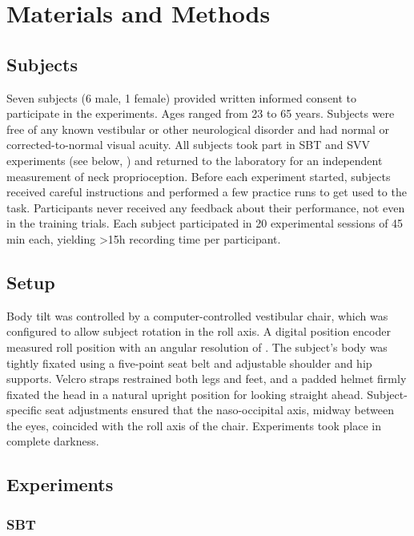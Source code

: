 \section{Materials and Methods}
\label{p1:sec:methods}

\subsection{Subjects}

Seven subjects (6 male, 1 female) provided written informed consent to participate in the experiments. Ages ranged from 23 to 65 years. Subjects were free of any known vestibular or other neurological disorder and had normal or corrected-to-normal visual acuity. All subjects took part in SBT and SVV experiments (see below, ) and returned to the laboratory for an independent measurement of neck proprioception. Before each experiment started, subjects received careful instructions and performed a few practice runs to get used to the task. Participants never received any feedback about their performance, not even in the training trials. Each subject participated in 20 experimental sessions of {\textapprox}45 min each, yielding {\textgreater}15h recording time per participant.

\subsection{Setup}

Body tilt was controlled by a computer-controlled vestibular chair, which was configured to allow subject rotation in the roll axis. A digital position encoder measured roll position with an angular resolution of . The subject's body was tightly fixated using a five-point seat belt and adjustable shoulder and hip supports. Velcro straps restrained both legs and feet, and a padded helmet firmly fixated the head in a natural upright position for looking straight ahead. Subject-specific seat adjustments ensured that the naso-occipital axis, midway between the eyes, coincided with the roll axis of the chair. Experiments took place in complete darkness. 

\subsection{Experiments}
\label{p1:sec:experiments}

\subsubsection{SBT}
\label{p1:sec:methods_sbt}
 
